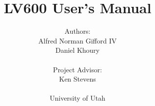 \documentclass[letterpaper, 12 pt]{report}
\begin{document}
\title{LV600 User's Manual}
\author{Authors: \\ Alfred Norman Gifford IV \\ Daniel Khoury \\ \\ Project Advisor: \\ Ken Stevens \\ \\ University of Utah}
\maketitle
\pagestyle{empty}

\tableofcontents
\newpage














%

\end{document}
